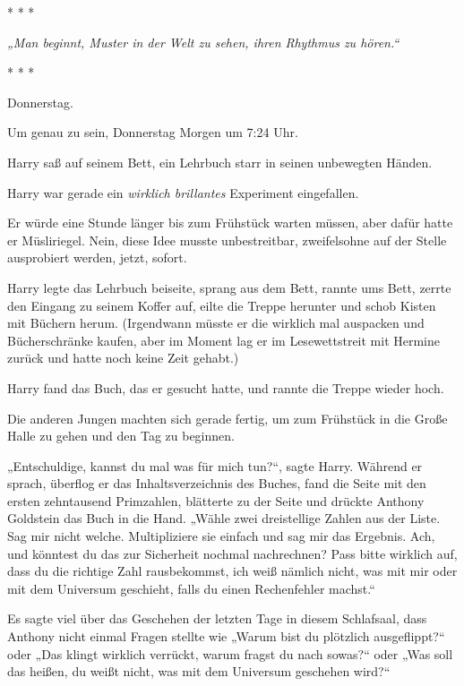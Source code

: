 

\hypertarget{die-bevorzugte-hypothese}{%

* * *

\emph{„Man beginnt, Muster in der Welt zu sehen, ihren Rhythmus zu hören.“}

* * *

Donnerstag.

Um genau zu sein, Donnerstag Morgen um 7:24 Uhr.

Harry saß auf seinem Bett, ein Lehrbuch starr in seinen unbewegten Händen.

Harry war gerade ein \emph{wirklich brillantes} Experiment eingefallen.

Er würde eine Stunde länger bis zum Frühstück warten müssen, aber dafür hatte er Müsliriegel. Nein, diese Idee musste unbestreitbar, zweifelsohne auf der Stelle ausprobiert werden, jetzt, sofort.

Harry legte das Lehrbuch beiseite, sprang aus dem Bett, rannte ums Bett, zerrte den Eingang zu seinem Koffer auf, eilte die Treppe herunter und schob Kisten mit Büchern herum. (Irgendwann müsste er die wirklich mal auspacken und Bücherschränke kaufen, aber im Moment lag er im Lesewettstreit mit Hermine zurück und hatte noch keine Zeit gehabt.)

Harry fand das Buch, das er gesucht hatte, und rannte die Treppe wieder hoch.

Die anderen Jungen machten sich gerade fertig, um zum Frühstück in die Große Halle zu gehen und den Tag zu beginnen.

„Entschuldige, kannst du mal was für mich tun?“, sagte Harry. Während er sprach, überflog er das Inhaltsverzeichnis des Buches, fand die Seite mit den ersten zehntausend Primzahlen, blätterte zu der Seite und drückte Anthony Goldstein das Buch in die Hand. „Wähle zwei dreistellige Zahlen aus der Liste. Sag mir nicht welche. Multipliziere sie einfach und sag mir das Ergebnis. Ach, und könntest du das zur Sicherheit nochmal nachrechnen? Pass bitte wirklich auf, dass du die richtige Zahl rausbekommst, ich weiß nämlich nicht, was mit mir oder mit dem Universum geschieht, falls du einen Rechenfehler machst.“

Es sagte viel über das Geschehen der letzten Tage in diesem Schlafsaal, dass Anthony nicht einmal Fragen stellte wie „Warum bist du plötzlich ausgeflippt?“ oder „Das klingt wirklich verrückt, warum fragst du nach sowas?“ oder „Was soll das heißen, du weißt nicht, was mit dem Universum geschehen wird?“

}
